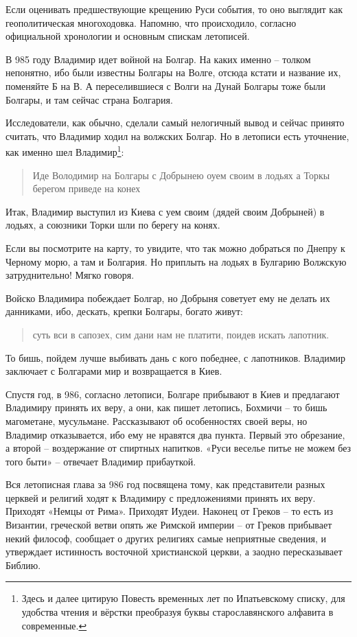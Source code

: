 \documentclass[a5paper,11pt,openany]{article}
\begin{document}
Если оценивать предшествующие крещению Руси события, то оно выглядит как геополитическая многоходовка. Напомню, что происходило, согласно официальной хронологии и основным спискам летописей.

В 985 году Владимир идет войной на Болгар. На каких именно – толком непонятно, ибо были известны Болгары на Волге, отсюда кстати и название их, поменяйте Б на В. А переселившиеся с Волги на Дунай Болгары тоже были Болгары, и там сейчас страна Болгария. 

Исследователи, как обычно, сделали самый нелогичный вывод и сейчас принято считать, что Владимир ходил на волжских Болгар. Но в летописи есть уточнение, как именно шел Владимир\footnote{Здесь и далее цитирую Повесть временных лет по Ипатьевскому списку\cite{ipat}, для удобства чтения и вёрстки преобразуя буквы старославянского алфавита в современные.}:

\begin{quotation}
\noindent Иде Володимир на Болгары с
Добрынею оуем своим в лодьях а Торкы берегом приведе на конех
\end{quotation}

Итак, Владимир выступил из Киева с уем своим (дядей своим Добрыней) в лодьях, а союзники Торки шли по берегу на конях.

Если вы посмотрите на карту, то увидите, что так можно добраться по Днепру к Черному морю, а там и Болгария. Но приплыть на лодьях в Булгарию Волжскую затруднительно! Мягко говоря.

   Войско Владимира побеждает Болгар, но Добрыня советует ему не делать их данниками, ибо, дескать, крепки Болгары, богато живут:

\begin{quotation}
\noindent суть вси в сапозех, сим дани нам не платити, поидев искать лапотник.
\end{quotation} 

   То бишь, пойдем лучше выбивать дань с кого победнее, с лапотников. Владимир заключает с Болгарами мир и возвращается в Киев.

Спустя год, в 986, согласно летописи, Болгаре прибывают в Киев и предлагают Владимиру принять их веру, а они, как пишет летопись, Бохмичи – то бишь магометане, мусульмане. Рассказывают об особенностях своей веры, но Владимир отказывается, ибо ему не нравятся два пункта. Первый это обрезание, а второй – воздержание от спиртных напитков. «Руси веселье питье не можем без того быти» – отвечает Владимир прибауткой.

   Вся летописная глава за 986 год посвящена тому, как представители разных церквей и религий ходят к Владимиру с предложениями принять их веру. Приходят «Немцы от Рима». Приходят Иудеи. Наконец от Греков – то есть из Византии, греческой ветви опять же Римской империи – от Греков прибывает некий философ, сообщает о других религиях самые неприятные сведения, и утверждает истинность восточной христианской церкви, а заодно пересказывает Библию. 
\end{document}
